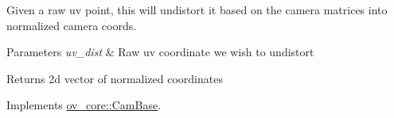 Given a raw uv point, this will undistort it based on the camera matrices into normalized camera coords. 


\begin{DoxyParams}{Parameters}
{\em uv\+\_\+dist} & Raw uv coordinate we wish to undistort \\
\hline
\end{DoxyParams}
\begin{DoxyReturn}{Returns}
2d vector of normalized coordinates 
\end{DoxyReturn}


Implements \hyperlink{classov__core_1_1CamBase_ad0db03f97e5a12f5ad757f72e60f50e4}{ov\+\_\+core\+::\+Cam\+Base}.

